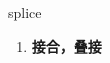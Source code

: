 
\begin{frame}
{\huge splice}
\begin{center}
\begin{enumerate}\Large
  \item \textbf{接合，叠接}
\end{enumerate}
\end{center}
\end{frame}
